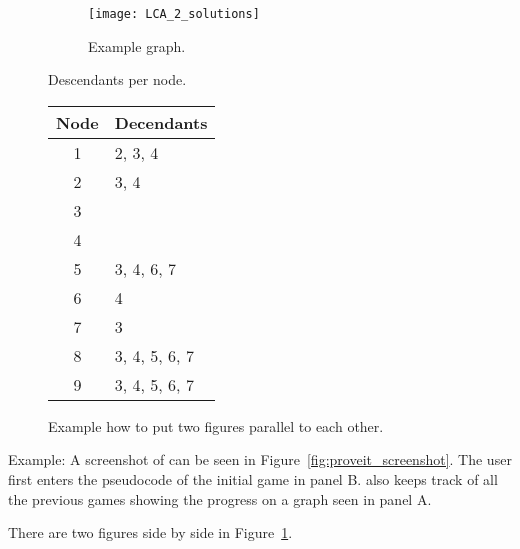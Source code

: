 \begin{figure} [htbp]
  \centering
\begin{subfigure}[c]{0.45\textwidth}
\texttt{[image: LCA\_2\_solutions]}
\caption{Example graph.}
\end{subfigure}
\hfil
\begin{subtable}[c]{0.3\textwidth}
\centering
\caption{Descendants per node.}
\begin{tabular}{cl}
  \toprule
	Node & Decendants \\
  \midrule
  1 & 2, 3, 4 \\
  2 & 3, 4 \\
  3 & \\
  4 & \\
  5 & 3, 4, 6, 7 \\
  6 & 4 \\
  7 & 3 \\
  8 & 3, 4, 5, 6, 7\\
  9 & 3, 4, 5, 6, 7\\
  \bottomrule
\end{tabular}
\end{subtable}
%
\caption{Example how to put two figures parallel to each other.}
\label{fig:LCA_2_solutions}
\end{figure}


Example: A screenshot of \proveit can be seen in Figure~\ref{fig:proveit_screenshot}. The user first enters the pseudocode of the initial game in panel B. \proveit also keeps track of all the previous games showing the progress on a graph seen in panel A.

There are two figures side by side in Figure~\ref{fig:LCA_2_solutions}.

